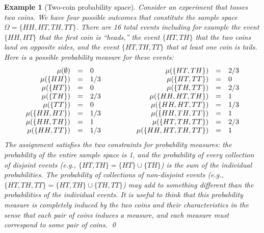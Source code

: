 \documentclass{article}
\theoremstyle{indented}
\newtheorem{example}{Example}
\newcommand{\pmeas}{\ensuremath{\mu}}
\theoremstyle{plain}
\theoremstyle{plain}
\begin{document}
\begin{example}[Two-coin probability space]
  Consider an experiment that tosses two coins. We have four possible
  outcomes that constitute the sample space
  $\Omega = \{ HH, HT, TH, TT \}$. There are 16 total events including
  for example the event $\{ HH, HT \}$ that the first coin is
  ``heads,'' the event $\{ HT, TH \}$ that the two coins land on
  opposite sides, and the event $\{ HT, TH, TT\}$ that at least one
  coin is tails. Here is a possible probability measure for these
  events:
\[\begin{array}{c@{\qquad\qquad}c}
\begin{array}{rcl}
\pmeas(\emptyset) &=& 0 \\
\pmeas(\{ HH \}) &=& 1/3 \\
\pmeas(\{ HT \}) &=& 0 \\
\pmeas(\{ TH \}) &=& 2/3 \\
\pmeas(\{ TT \}) &=& 0 \\
\pmeas(\{  HH, HT \}) &=& 1/3 \\
\pmeas(\{  HH, TH \}) &=& 1 \\
\pmeas(\{  HH , TT \}) &=& 1/3 
\end{array} & \begin{array}{rcl}
\pmeas(\{  HT, TH \}) &=& 2/3 \\
\pmeas(\{  HT , TT \}) &=& 0 \\
\pmeas(\{  TH , TT \}) &=& 2/3 \\
\pmeas(\{  HH, HT, TH \}) &=& 1 \\
\pmeas(\{  HH, HT, TT \}) &=& 1/3 \\
\pmeas(\{  HH, TH, TT \}) &=& 1 \\
\pmeas(\{  HT, TH, TT \}) &=& 2/3 \\
\pmeas(\{  HH, HT, TH, TT \}) &=& 1
\end{array}
\end{array}\]
The assignment satisfies the two constraints for probability measures:
the probability of the entire sample space is 1, and the probability
of every collection of disjoint events (e.g.,
$\{ HT, TH \} = \{ HT \} \cup \{ TH \}$) is the sum of the individual
probabilities. The probability of collections of non-disjoint events
(e.g., $\{ HT, TH, TT \} = \{ HT, TH \} \cup \{ TH , TT \}$) may add
to something different than the probabilities of the individual
events. It is useful to think that this probability measure is
completely induced by the two coins and their characteristics in the
sense that each pair of coins induces a measure, and each measure must
correspond to some pair of coins.
\qed\end{example}
\end{document}
